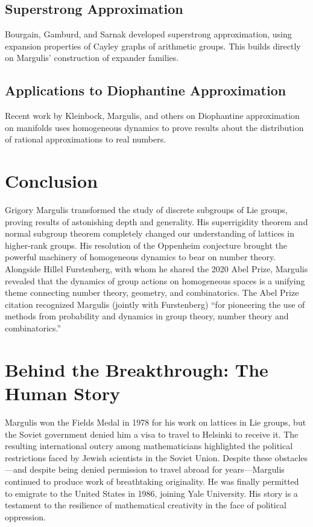 \subsection{Superstrong Approximation}

Bourgain, Gamburd, and Sarnak developed superstrong approximation, using expansion properties of Cayley graphs of arithmetic groups. This builds directly on Margulis' construction of expander families.

\subsection{Applications to Diophantine Approximation}

Recent work by Kleinbock, Margulis, and others on Diophantine approximation on manifolds uses homogeneous dynamics to prove results about the distribution of rational approximations to real numbers.

\section{Conclusion}

Grigory Margulis transformed the study of discrete subgroups of Lie groups, proving results of astonishing depth and generality. His superrigidity theorem and normal subgroup theorem completely changed our understanding of lattices in higher-rank groups. His resolution of the Oppenheim conjecture brought the powerful machinery of homogeneous dynamics to bear on number theory. Alongside Hillel Furstenberg, with whom he shared the 2020 Abel Prize, Margulis revealed that the dynamics of group actions on homogeneous spaces is a unifying theme connecting number theory, geometry, and combinatorics. The Abel Prize citation recognized Margulis (jointly with Furstenberg) ``for pioneering the use of methods from probability and dynamics in group theory, number theory and combinatorics.''

\section{Behind the Breakthrough: The Human Story}

Margulis won the Fields Medal in 1978 for his work on lattices in Lie groups, but the Soviet government denied him a visa to travel to Helsinki to receive it. The resulting international outcry among mathematicians highlighted the political restrictions faced by Jewish scientists in the Soviet Union. Despite these obstacles---and despite being denied permission to travel abroad for years---Margulis continued to produce work of breathtaking originality. He was finally permitted to emigrate to the United States in 1986, joining Yale University. His story is a testament to the resilience of mathematical creativity in the face of political oppression.


